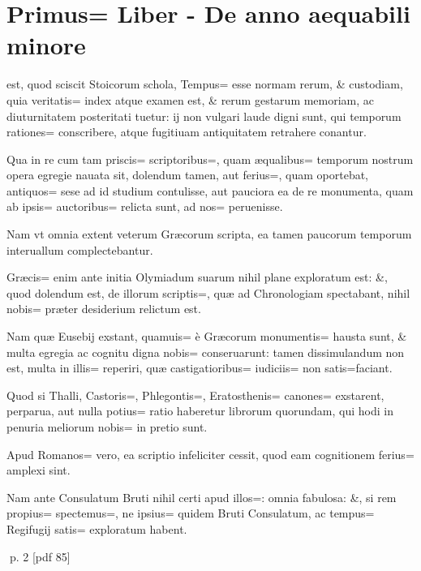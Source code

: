 \chapter{Primus= Liber - De anno aequabili minore}

 \begin{parnumbers}
est, quod sciscit Stoicorum schola, Tempus= esse normam rerum, \& custodiam, quia veritatis= index atque examen est, \& rerum gestarum memoriam, ac diuturnitatem posteritati tuetur: ij non vulgari laude digni sunt, qui temporum rationes= conscribere, atque fugitiuam antiquitatem retrahere conantur.

Qua in re cum tam priscis= scriptoribus=, quam æqualibus= temporum nostrum opera egregie nauata sit, dolendum tamen, aut
ferius=, quam oportebat, antiquos= sese ad id studium contulisse, aut pauciora ea de re monumenta, quam ab ipsis= auctoribus= relicta sunt, ad nos= peruenisse.

Nam vt omnia extent veterum Græcorum scripta, ea tamen paucorum temporum interuallum complectebantur.

Græcis= enim ante initia Olymiadum suarum nihil plane exploratum est: \&, quod dolendum est, de illorum scriptis=, quæ ad Chronologiam spectabant, nihil nobis= præter desiderium relictum est.

Nam quæ Eusebij exstant, quamuis= è Græcorum monumentis= hausta sunt, \& multa egregia ac cognitu digna nobis= conseruarunt: tamen dissimulandum non est, multa in illis= reperiri, quæ castigatioribus= iudiciis= non satis=faciant.

Quod si Thalli, Castoris=, Phlegontis=, Eratosthenis= canones= exstarent, perparua, aut nulla potius= ratio haberetur librorum quorundam, qui hodi in penuria meliorum nobis= in pretio sunt.

Apud Romanos= vero, ea scriptio infeliciter cessit, quod eam cognitionem ferius= amplexi sint.

Nam ante Consulatum Bruti nihil certi apud illos=: omnia fabulosa: \&, si rem propius= spectemus=, ne ipsius= quidem Bruti Consulatum, ac tempus= Regifugij satis= exploratum habent.

\end{parnumbers}
\clearpage
p. 2 [pdf 85]

